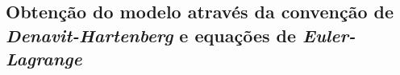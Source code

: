 \begin{anexosenv}
\partanexos

\chapter{Obtenção do modelo através da convenção de \textit{Denavit-Hartenberg} e equações de \textit{Euler-Lagrange}}
\label{anexo:denHatEulerLagr}



\end{anexosenv}